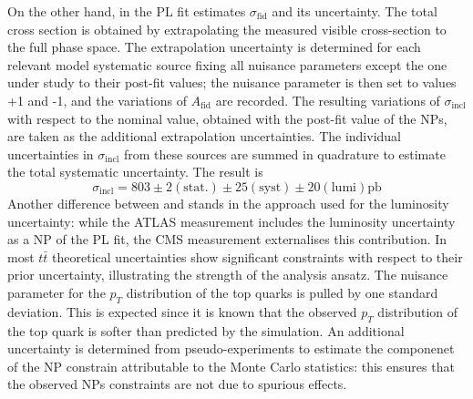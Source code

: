 \documentclass[12pt]{article}
\begin{document}
On the other hand, in \cite{CMS_inclusive} the PL fit estimates $\sigma_{\mathrm{fid}}$ and its uncertainty. The total cross section is obtained by extrapolating the measured visible cross-section to the full phase space. The extrapolation uncertainty is determined for each relevant model systematic source fixing all nuisance parameters except the one under study to their post-fit values; the nuisance parameter is then set to values +1 and -1, and the variations of $A_{\mathrm{fid}}$ are recorded. The resulting variations of $\sigma_{\mathrm{incl}}$ with respect to the nominal value, obtained with the post-fit value of the NPs, are taken as the additional extrapolation uncertainties. The individual uncertainties in $\sigma_{\mathrm{incl}}$ from these sources are summed in quadrature to estimate the total systematic uncertainty. The result is
\begin{equation}
\sigma_{\mathrm{incl}} = 803\pm2(\mathrm{stat.})\pm25(\mathrm{syst})\pm20(\mathrm{lumi})\mathrm{pb}
\end{equation}
Another difference between \cite{Aad_2020} and \cite{CMS_inclusive} stands in the approach used for the luminosity uncertainty: while the ATLAS measurement includes the luminosity uncertainty as a NP of the PL fit, the CMS measurement externalises this contribution.
In \cite{CMS_inclusive} most $t\bar{t}$ theoretical uncertainties show significant constraints with respect to their prior uncertainty, illustrating the strength of the analysis ansatz. The nuisance parameter for the $p_T$ distribution of the top quarks is pulled by one standard deviation. This is expected since it is known that the observed $p_T$ distribution of the top quark is softer than predicted by the simulation. An additional uncertainty is determined from pseudo-experiments to estimate the componenet of the NP constrain attributable to the Monte Carlo statistics: this ensures that the observed NPs constraints are not due to spurious effects.
\end{document}
